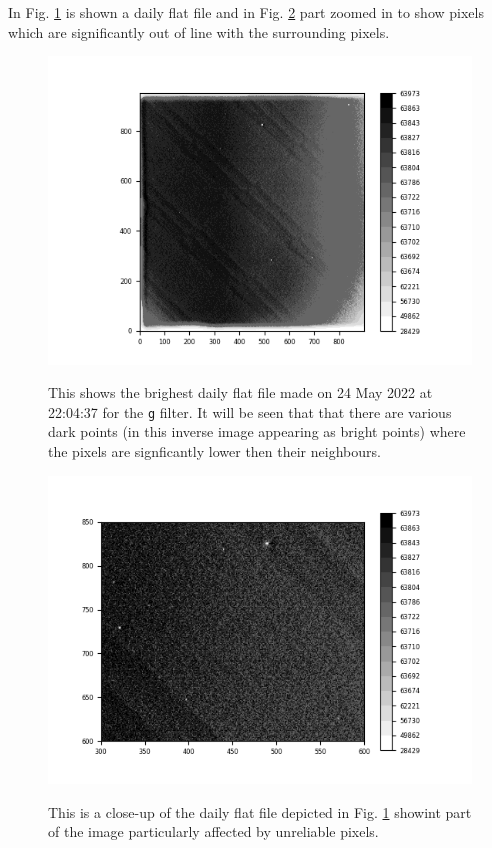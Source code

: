 In Fig. \ref{fig:flatdemobadpix} is shown a daily flat file and in Fig.
\ref{fig:flatdemozoom} part zoomed in to show pixels which are significantly out
of line with the surrounding pixels.

\begin{figure}[!htbp]
\begin{center}
\includegraphics[scale=1]{images/flatdemo2022.png}
\end{center}   
\caption{This shows the brighest daily flat file made on 24 May 2022 at 22:04:37
for the \texttt{g} filter. It will be seen that that there are various dark
points (in this inverse image appearing as bright points) where the pixels are
signficantly lower then their neighbours.} \protect\label{fig:flatdemobadpix}
\end{figure}

\begin{figure}[!htbp]
\begin{center}
\includegraphics[scale=1]{images/flatdemo2022z.png}
\end{center}   
\caption{This is a close-up of the daily flat file depicted in Fig.
\ref{fig:flatdemobadpix} showint part of the image particularly affected by
unreliable pixels.} \protect\label{fig:flatdemozoom}
\end{figure}

